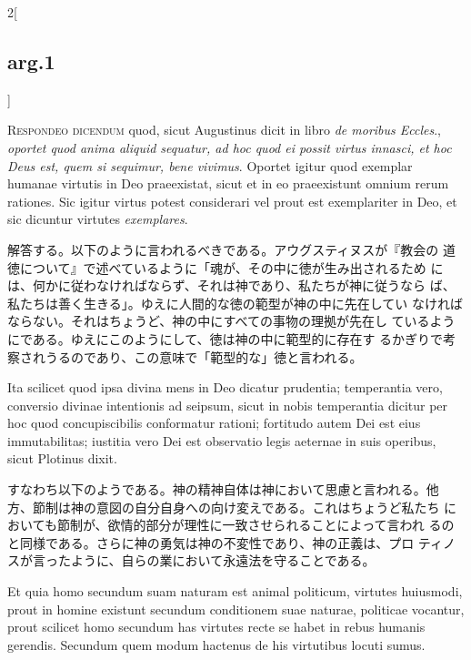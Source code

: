 \documentclass[paper=a4paper,fontsize=10pt,jafontsize=9pt,titlepage]{jlreq}
\begin{document}
\begin{paracol}{2}[\subsection{arg.1}]

{\scshape Respondeo dicendum} quod, sicut Augustinus dicit in libro
 {\itshape de moribus Eccles}., {\itshape oportet quod anima aliquid
 sequatur, ad hoc quod ei possit virtus innasci, et hoc Deus est, quem
 si sequimur, bene vivimus}. Oportet igitur quod exemplar humanae
 virtutis in Deo praeexistat, sicut et in eo praeexistunt omnium rerum
 rationes. Sic igitur virtus potest considerari vel prout est
 exemplariter in Deo, et sic dicuntur virtutes {\itshape exemplares}.

\switchcolumn

解答する。以下のように言われるべきである。アウグスティヌスが『教会の
 道徳について』で述べているように「魂が、その中に徳が生み出されるため
 には、何かに従わなければならず、それは神であり、私たちが神に従うなら
 ば、私たちは善く生きる」。ゆえに人間的な徳の範型が神の中に先在してい
 なければならない。それはちょうど、神の中にすべての事物の理拠が先在し
 ているようにである。ゆえにこのようにして、徳は神の中に範型的に存在す
 るかぎりで考察されうるのであり、この意味で「範型的な」徳と言われる。

\switchcolumn*

Ita scilicet quod ipsa divina mens in Deo dicatur prudentia;
 temperantia vero, conversio divinae intentionis ad seipsum, sicut in
 nobis temperantia dicitur per hoc quod concupiscibilis conformatur
 rationi; fortitudo autem Dei est eius immutabilitas; iustitia vero
 Dei est observatio legis aeternae in suis operibus, sicut Plotinus
 dixit.

\switchcolumn

すなわち以下のようである。神の精神自体は神において思慮と言われる。他
 方、節制は神の意図の自分自身への向け変えである。これはちょうど私たち
 においても節制が、欲情的部分が理性に一致させられることによって言われ
 るのと同様である。さらに神の勇気は神の不変性であり、神の正義は、プロ
 ティノスが言ったように、自らの業において永遠法を守ることである。

\switchcolumn*

Et quia homo secundum suam naturam est animal politicum, virtutes
 huiusmodi, prout in homine existunt secundum conditionem suae
 naturae, politicae vocantur, prout scilicet homo secundum has
 virtutes recte se habet in rebus humanis gerendis. Secundum quem
 modum hactenus de his virtutibus locuti sumus.


\end{paracol}
\end{document}
